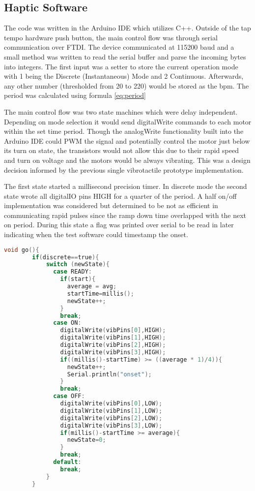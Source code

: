 \subsection{Haptic Software}
The code was written in the Arduino IDE which utilizes C++. Outside of the tap tempo hardware push button, the main control flow was through serial communication over FTDI. The device communicated at 115200 baud and a small method was written to read the serial buffer and parse the incoming bytes into integers. The first input was a setter to store the current operation mode with 1 being the Discrete (Instantaneous) Mode and 2 Continuous. Afterwards, any other number (thresholded from 20 to 220) would be stored as the bpm. The period was calculated using formula \ref{eq:period}

The main control flow was two state machines which were delay independent. Depending on mode selection it would send digitalWrite commands to each motor within the set time period.
Though the analogWrite functionality built into the Arduino IDE could PWM the signal and potentially control the motor just below its turn on state, the transistors would not allow this due to their rapid speed and turn on voltage and the motors would be always vibrating. This was a design decision informed by the previous single vibrotactile prototype implementation.

The first state started a millisecond precision timer. In discrete mode the second state wrote all digitalIO pins HIGH for a quarter of the period. A half on/off implementation was considered but determined to be not as efficient in communicating rapid pulses since the ramp down time overlapped with the next on period. During this state a flag was printed over serial to be read in later indicating when the test software could timestamp the onset.

\begin{lstlisting}[language=C]
    void go(){
        if(discrete==true){
            switch (newState){
              case READY:
                if(start){
                  average = avg;
                  startTime=millis();
                  newState++;
                }
                break;
              case ON: 
                digitalWrite(vibPins[0],HIGH);
                digitalWrite(vibPins[1],HIGH);
                digitalWrite(vibPins[2],HIGH);
                digitalWrite(vibPins[3],HIGH);
                if((millis()-startTime) >= ((average * 1)/4)){
                  newState++;
                  Serial.println("onset");
                }
                break;
              case OFF:
                digitalWrite(vibPins[0],LOW);
                digitalWrite(vibPins[1],LOW);
                digitalWrite(vibPins[2],LOW);
                digitalWrite(vibPins[3],LOW);
                if(millis()-startTime >= average){
                  newState=0;
                }
                break;
              default:
                break;
            }
        }
\end{lstlisting}

